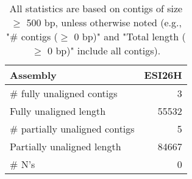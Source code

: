 \documentclass[12pt,a4paper]{article}
\begin{document}
\begin{table}[ht]
\begin{center}
\caption{All statistics are based on contigs of size $\geq$ 500 bp, unless otherwise noted (e.g., "\# contigs ($\geq$ 0 bp)" and "Total length ($\geq$ 0 bp)" include all contigs).}
\begin{tabular}{|l*{1}{|r}|}
\hline
Assembly & ESI26H \\ \hline
\# fully unaligned contigs & 3 \\ \hline
Fully unaligned length & 55532 \\ \hline
\# partially unaligned contigs & 5 \\ \hline
Partially unaligned length & 84667 \\ \hline
\# N's & 0 \\ \hline
\end{tabular}
\end{center}
\end{table}
\end{document}
